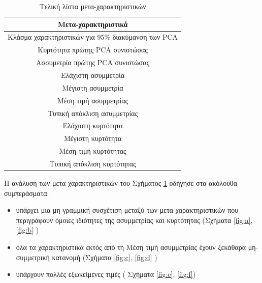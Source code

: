 \documentclass[]{article}
\numberwithin{equation}{section}		%
\numberwithin{figure}{section}			%
\numberwithin{table}{section}				%
\begin{document}
    \begin{table}[!htb]
    \begin{center}
    	\begin{tabular}{ |c| } 
    		\hline
    		Μετα-χαρακτηριστικά\\
    		\hline
    		Κλάσμα χαρακτηριστικών για 95$\%$ διακύμανση των PCA \\ 
    		Κυρτότητα πρώτης PCA συνιστώσας   \\ 
        	Ασσυμετρία πρώτης PCA συνιστώσας   \\ 
        	Ελάχιστη ασυμμετρία \\
        	Μέγιστη ασυμμετρία \\
        	Μέση τιμή ασυμμετρίας \\
        	Τυπική απόκλιση ασυμμετρίας \\
        	Ελάχιστη κυρτότητα \\
        	Μέγιστη κυρτότητα \\
        	Μέση τιμή κυρτότητας \\
        	Τυπική απόκλιση κυρτότητας \\        	
    		\hline
    	\end{tabular}    
    \end{center}
    	\caption{Τελική λίστα μετα-χαρακτηριστικών}\label{mfs}
    \end{table}
    Η ανάλυση των μετα-χαρακτηριστικών του Σχήματος \ref{mfs} οδήγησε στα ακόλουθα συμπεράσματα:
    \begin{itemize}
    	\item υπάρχει μια μη-γραμμική συσχέτιση μεταξύ των μετα-χαρακτηριστικών που περιγράφουν όμοιες ιδιότητες της ασυμμετρίας και κυρτότητας (Σχήματα \ref{fig:a}, \ref{fig:b} )
    	\item όλα τα χαρακτηριστικά εκτός από τη Μέση τιμή ασυμμετρίας έχουν ξεκάθαρα μη-συμμετρική κατανομή (Σχήματα \ref{fig:c}, \ref{fig:d} )
    	\item υπάρχουν πολλές εξωκείμενες τιμές ( Σχήματα \ref{fig:e}, \ref{fig:f})
    \end{itemize}
    
\end{document}

